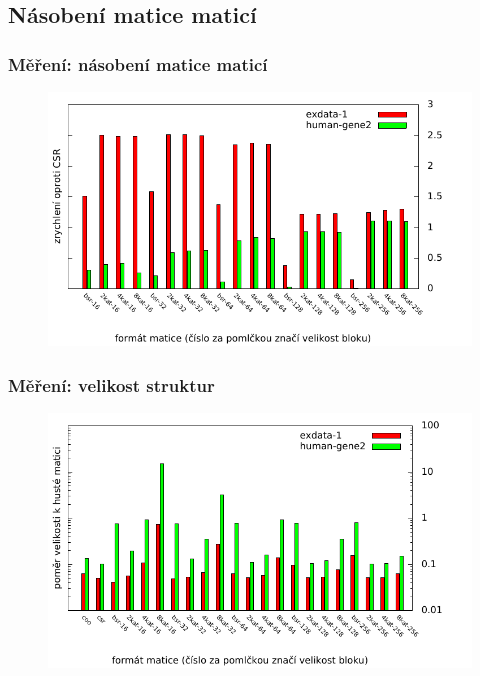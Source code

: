 \documentclass{beamer}
\begin{document}
\subsection{Násobení matice maticí}
\begin{frame}
	\frametitle{Měření: násobení matice maticí}
	
	\begin{figure}
		\centering
		\includegraphics[width=1.0\textwidth]{./images/mmms2}
	\end{figure}	
\end{frame}
\begin{frame}
	\frametitle{Měření: velikost struktur}
	
	\begin{figure}
		\centering
		\includegraphics[width=1.0\textwidth]{./images/ram}
	\end{figure}	
\end{frame}
\end{document}
